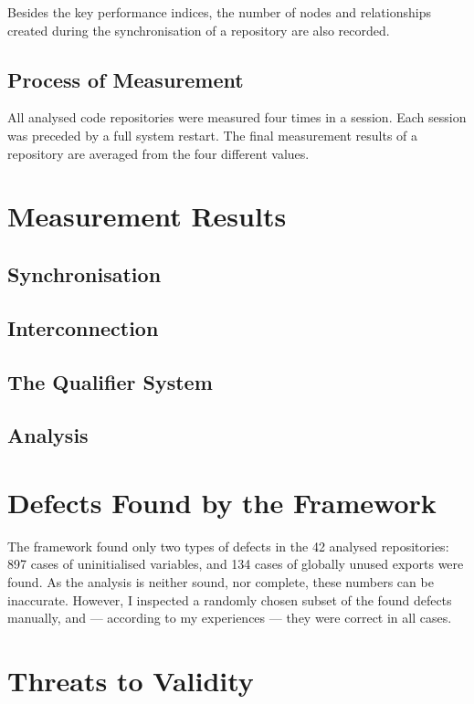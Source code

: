Besides the key performance indices, the number of nodes and relationships created during the synchronisation of a repository are also recorded.


\subsection{Process of Measurement}

All analysed code repositories were measured four times in a session. Each session was preceded by a full system restart. The final measurement results of a repository are averaged from the four different values.


\section{Measurement Results}

\subsection{Synchronisation}

\subsection{Interconnection}

\subsection{The Qualifier System}

\subsection{Analysis}


\section{Defects Found by the Framework}

The framework found only two types of defects in the 42 analysed repositories: 897 cases of uninitialised variables, and 134 cases of globally unused exports were found. As the analysis is neither sound, nor complete, these numbers can be inaccurate. However, I inspected a randomly chosen subset of the found defects manually, and — according to my experiences — they were correct in all cases.


\section{Threats to Validity}

